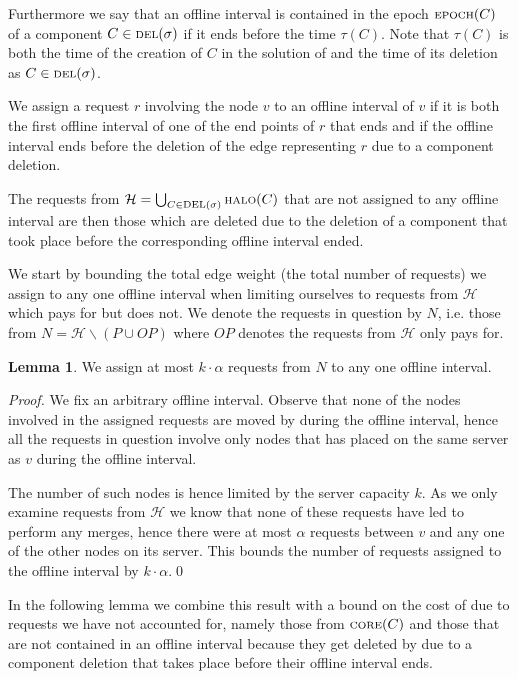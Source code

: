 \documentclass[a4paper,xcolor=dvipsnames, tikz, 12pt]{article}
\newcommand{\nl}{\newline}
\newcommand{\crep}{\text{C{\scriptsize REP}}}
\newcommand{\del}{\text{\scriptsize DEL}}
\newcommand{\opt}{\text{O{\scriptsize PT}}}
\newcommand{\core}{\text{\scriptsize CORE}}
\newcommand{\halo}{\text{\scriptsize HALO}}
\newcommand{\epoch}{\text{\scriptsize EPOCH}}
\theoremstyle{definition}
\newtheorem{lemma}[defi]{Lemma}
\begin{document}
Furthermore we say that an offline interval is contained in the epoch $\epoch(C)$ of a component $C\in\del{}(\sigma)$ if it ends before the time $\tau(C)$. Note that $\tau(C)$ is both the time of the creation of $C$ in the solution of \crep{} and the time of its deletion as $C\in\del{}(\sigma)$.

We assign a request $r$ involving the node $v$ to an offline interval of $v$ if it is both the first offline interval of one of the end points of $r$ that ends and if the offline interval ends before the deletion of the edge representing $r$ due to a component deletion.

The requests from $\mathcal{H}=\bigcup_{C\in\del{}(\sigma)}\halo{}(C)$ that are not assigned to any offline interval are then those which are deleted due to the deletion of a component that took place before the corresponding offline interval ended.

We start by bounding the total edge weight (the total number of requests) we assign to any one offline interval when limiting ourselves to requests from $\mathcal{H}$ which \crep{} pays for but \opt{} does not. We denote the requests in question by $N$, i.e. those from $N=\mathcal{H}\backslash (P\cup OP)$ where $OP$ denotes the requests from $\mathcal{H}$ only \opt{} pays for.


\begin{lemma}
	We assign at most $k\cdot\alpha$ requests from $N$ to any one offline interval.
\end{lemma}

\textit{Proof.} We fix an arbitrary offline interval. Observe that none of the nodes involved in the assigned requests are moved by \opt{} during the offline interval, hence all the requests in question involve only nodes that \opt{} has placed on the same server as $v$ during the offline interval. 

The number of such nodes is hence limited by the server capacity $k$. As we only examine requests from $\mathcal{H}$ we know that none of these requests have led \crep{} to perform any merges, hence there were at most $\alpha$ requests between $v$ and any one of the other nodes on its server. This bounds the number of requests assigned to the offline interval by $k\cdot\alpha$.\qed\nl

In the following lemma we combine this result with a bound on the cost of \opt{} due to requests we have not accounted for, namely those from $\core(C)$ and those that are not contained in an offline interval because they get deleted by \crep{} due to a component deletion that takes place before their offline interval ends.
\end{document}
